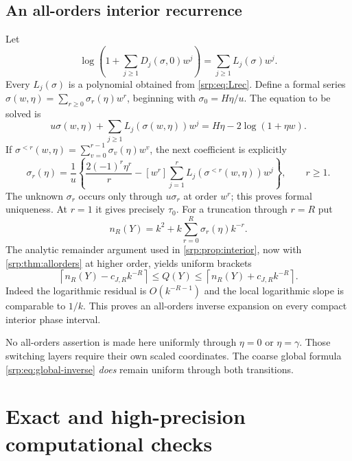 \documentclass[11pt,a4paper]{article}
\numberwithin{equation}{section}
\theoremstyle{definition}
\theoremstyle{remark}
\newcommand{\ceil}[1]{\left\lceil #1\right\rceil}
\begin{document}
\subsection{An all-orders interior recurrence}
Let
\begin{equation}
 \log\left(1+\sum_{j\ge1}D_j(\sigma,0)w^j\right)
 =\sum_{j\ge1}L_j(\sigma)w^j.
 \label{srp:eq:Lj-sigma}
\end{equation}
Every $L_j(\sigma)$ is a polynomial obtained from
\eqref{srp:eq:Lrec}. Define a formal series
$\sigma(w,\eta)=\sum_{r\ge0}\sigma_r(\eta)w^r$, beginning with
$\sigma_0=H\eta/u$. The equation to be solved is
\begin{equation}
 u\sigma(w,\eta)+\sum_{j\ge1}L_j(\sigma(w,\eta))w^j
 =H\eta-2\log(1+\eta w).
 \label{srp:eq:interior-equation}
\end{equation}
If $\sigma^{<r}(w,\eta)=\sum_{v=0}^{r-1}\sigma_v(\eta)w^v$, the next
coefficient is explicitly
\begin{equation}
 \sigma_r(\eta)=\frac1u\left\{
 \frac{2(-1)^r\eta^r}{r}
 -[w^r]\sum_{j=1}^r L_j(\sigma^{<r}(w,\eta))w^j
 \right\},\qquad r\ge1.
 \label{srp:eq:interior-recurrence}
\end{equation}
The unknown $\sigma_r$ occurs only through $u\sigma_r$ at order $w^r$;
this proves formal uniqueness. At $r=1$ it gives precisely $\tau_0$.
For a truncation through $r=R$ put
\[
 n_R(Y)=k^2+k\sum_{r=0}^R\sigma_r(\eta)k^{-r}.
\]
The analytic remainder argument used in \cref{srp:prop:interior}, now with
\cref{srp:thm:allorders} at higher order, yields uniform brackets
\begin{equation}
 \ceil{n_R(Y)-c_{J,R}k^{-R}}
 \le Q(Y)\le
 \ceil{n_R(Y)+c_{J,R}k^{-R}}.
 \label{srp:eq:interior-allorders}
\end{equation}
Indeed the logarithmic residual is $O(k^{-R-1})$ and the local logarithmic
slope is comparable to $1/k$. This proves an all-orders inverse
expansion on every compact interior phase interval.

No all-orders assertion is made here uniformly through $\eta=0$ or
$\eta=\gamma$. Those switching layers require their own scaled
coordinates. The coarse global formula \eqref{srp:eq:global-inverse}
\emph{does} remain uniform through both transitions.

\section{Exact and high-precision computational checks}
\label{srp:sec:numerics}
\end{document}
